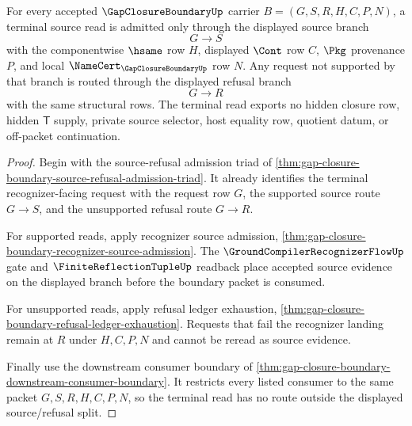 \begin{theorem}
\label{thm:gap-closure-boundary-terminal-source-admission}
For every accepted $\GapClosureBoundaryUp$ carrier $B=(G,S,R,H,C,P,N)$, a terminal source read is admitted only through the displayed source branch
$$
G \longrightarrow S
$$
with the componentwise $\hsame$ row $H$, displayed $\Cont$ row $C$, $\Pkg$ provenance $P$, and local $\NameCert_{\GapClosureBoundaryUp}$ row $N$. Any request not supported by that branch is routed through the displayed refusal branch
$$
G \longrightarrow R
$$
with the same structural rows. The terminal read exports no hidden closure row, hidden $\mathsf{T}$ supply, private source selector, host equality row, quotient datum, or off-packet continuation.
\end{theorem}
\begin{proof}
Begin with the source-refusal admission triad of \autoref{thm:gap-closure-boundary-source-refusal-admission-triad}. It already identifies the terminal recognizer-facing request with the request row $G$, the supported source route $G \longrightarrow S$, and the unsupported refusal route $G \longrightarrow R$.

For supported reads, apply recognizer source admission, \autoref{thm:gap-closure-boundary-recognizer-source-admission}. The $\GroundCompilerRecognizerFlowUp$ gate and $\FiniteReflectionTupleUp$ readback place accepted source evidence on the displayed branch before the boundary packet is consumed.

For unsupported reads, apply refusal ledger exhaustion, \autoref{thm:gap-closure-boundary-refusal-ledger-exhaustion}. Requests that fail the recognizer landing remain at $R$ under $H,C,P,N$ and cannot be reread as source evidence.

Finally use the downstream consumer boundary of \autoref{thm:gap-closure-boundary-downstream-consumer-boundary}. It restricts every listed consumer to the same packet $G,S,R,H,C,P,N$, so the terminal read has no route outside the displayed source/refusal split.
\end{proof}


